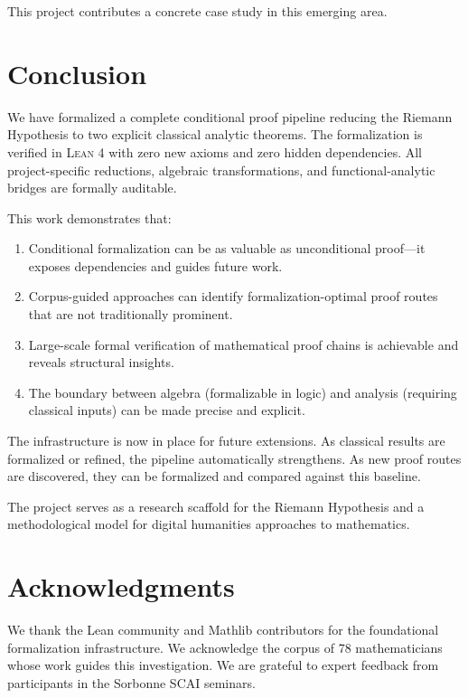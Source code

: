 \documentclass[11pt,a4paper]{article}
\newcommand{\Lean}{\textsc{Lean}\xspace}
\begin{document}
This project contributes a concrete case study in this emerging area.

\section{Conclusion}
\label{sec:conclusion}

We have formalized a complete conditional proof pipeline reducing the Riemann Hypothesis to two explicit classical analytic theorems. The formalization is verified in \Lean 4 with zero new axioms and zero hidden dependencies. All project-specific reductions, algebraic transformations, and functional-analytic bridges are formally auditable.

This work demonstrates that:

\begin{enumerate}
  \item Conditional formalization can be as valuable as unconditional proof—it exposes dependencies and guides future work.

  \item Corpus-guided approaches can identify formalization-optimal proof routes that are not traditionally prominent.

  \item Large-scale formal verification of mathematical proof chains is achievable and reveals structural insights.

  \item The boundary between algebra (formalizable in logic) and analysis (requiring classical inputs) can be made precise and explicit.
\end{enumerate}

The infrastructure is now in place for future extensions. As classical results are formalized or refined, the pipeline automatically strengthens. As new proof routes are discovered, they can be formalized and compared against this baseline.

The project serves as a research scaffold for the Riemann Hypothesis and a methodological model for digital humanities approaches to mathematics.

\section*{Acknowledgments}

We thank the Lean community and Mathlib contributors for the foundational formalization infrastructure. We acknowledge the corpus of 78 mathematicians whose work guides this investigation. We are grateful to expert feedback from participants in the Sorbonne SCAI seminars.
\end{document}

